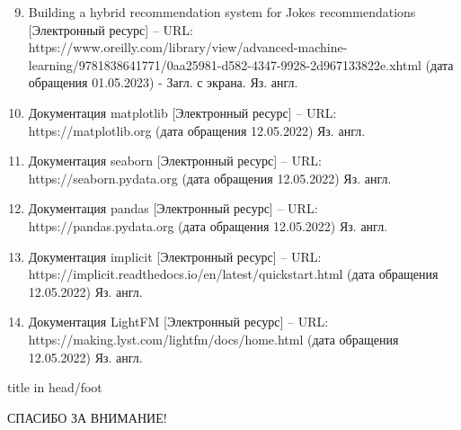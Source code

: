 \documentclass{beamer}
\begin{document}
\begin{frame}
  \begin{enumerate}
    \setcounter{enumi}{8}
    \item Building a hybrid recommendation system for Jokes recommendations [Электронный ресурс] – URL: https://www.oreilly.com/library/view/advanced-machine-learning/9781838641771/0aa25981-d582-4347-9928-2d967133822e.xhtml (дата обращения 01.05.2023) - Загл. с экрана. Яз. англ.
    \item Документация matplotlib [Электронный ресурс] – URL: https://matplotlib.org (дата обращения 12.05.2022) Яз. англ.
    \item Документация seaborn [Электронный ресурс] – URL: https://seaborn.pydata.org (дата обращения 12.05.2022) Яз. англ.
    \item Документация pandas [Электронный ресурс] – URL: https://pandas.pydata.org (дата обращения 12.05.2022) Яз. англ.
    \item Документация implicit [Электронный ресурс] – URL: https://implicit.readthedocs.io/en/latest/quickstart.html (дата обращения 12.05.2022) Яз. англ.
    \item Документация LightFM [Электронный ресурс] – URL: https://making.lyst.com/lightfm/docs/home.html (дата обращения 12.05.2022) Яз. англ.
  \end{enumerate}
\end{frame}

  \begin{frame}
    \begin{beamercolorbox}[ht=7ex, dp=4ex, center, shadow=true, rounded=true]{title in head/foot}
    \centerline{\LARGE{СПАСИБО ЗА ВНИМАНИЕ!}}
    \end{beamercolorbox}
  \end{frame}
\end{document}
